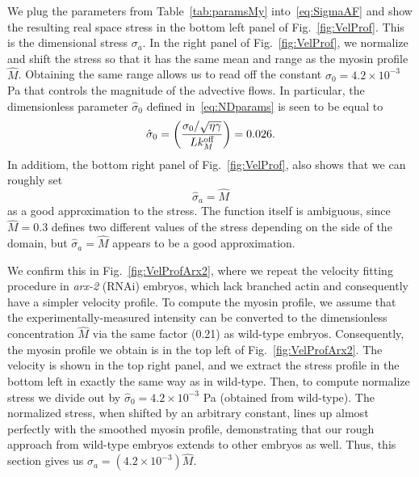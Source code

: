 \documentclass[11pt]{article}
\newcommand{\6}[1]{#1_{\text{6}}}
\newcommand{\3}[1]{#1_{\text{3}}}
\newcommand{\My}[1]{#1_M}
\begin{document}
We plug the parameters from Table\ \ref{tab:paramsMy} into\ \eqref{eq:SigmaAF} and show the resulting real space stress in the bottom left panel of Fig.\ \ref{fig:VelProf}. This is the dimensional stress $\sigma_a$. In the right panel of Fig.\ \ref{fig:VelProf}, we normalize and shift the stress so that it has the same mean and range as the myosin profile $\hat M$. Obtaining the same range allows us to read off the constant $\sigma_0=4.2 \times 10^{-3}$ Pa that controls the magnitude of the advective flows. In particular, the dimensionless parameter $\hat{\sigma}_0$ defined in\ \eqref{eq:NDparams} is seen to be equal to
\begin{equation}
\hat{\sigma}_0 = \left(\frac{\sigma_0/ \sqrt{\eta \gamma} }{L \My{\koff}}\right)  = 0.026.
\end{equation}
In additiom, the bottom right panel of Fig.\ \ref{fig:VelProf}, also shows that we can roughly set
\begin{equation}
\hat \sigma_a=\hat M
\end{equation}
as a good approximation to the stress. The function itself is ambiguous, since $\hat M=0.3$ defines two different values of the stress depending on the side of the domain, but $\hat \sigma_a=\hat M$ appears to be a good approximation.

We confirm this in Fig.\ \ref{fig:VelProfArx2}, where we repeat the velocity fitting procedure in \emph{arx-2} (RNAi) embryos, which lack branched actin and consequently have a simpler velocity profile. To compute the myosin profile, we assume that the experimentally-measured intensity can be converted to the dimensionless concentration $\hat M$ via the same factor (0.21) as wild-type embryos. Consequently, the myosin profile we obtain is in the top left of Fig.\ \ref{fig:VelProfArx2}. The velocity is shown in the top right panel, and we extract the stress profile in the bottom left in exactly the same way as in wild-type. Then, to compute normalize stress we divide out by $\hat{\sigma}_0=4.2 \times 10^{-3}$ Pa (obtained from wild-type). The normalized stress, when shifted by an arbitrary constant, lines up almost perfectly with the smoothed myosin profile, demonstrating that our rough approach from wild-type embryos extends to other embryos as well. Thus, this section gives us $\sigma_a = \left(4.2 \times 10^{-3}\right) \hat M$.
\end{document}

